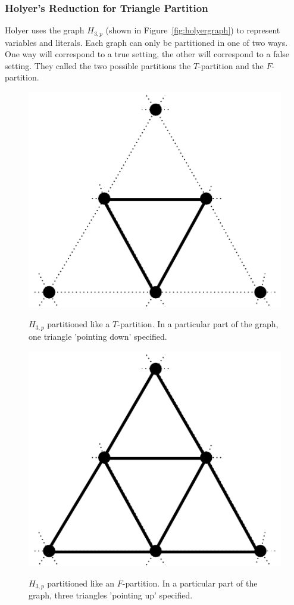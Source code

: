 \documentclass[runningheads,a4paper]{llncs}
\begin{document}
\subsubsection{Holyer's Reduction for Triangle Partition}
%
%
% 
Holyer uses the graph $H_{3,p}$ (shown in Figure~\ref{fig:holyergraph}) to represent variables and literals. Each graph can only be partitioned in one of two ways. One way will correspond to a true setting, the other will correspond to a false setting. They called the two possible partitions the $T$-partition and the $F$-partition. 

\begin{figure}
\begin{minipage}{0.5\linewidth}
\centering
\includegraphics[scale=0.5]{Tpartition.pdf}
\label{fig:tpart}
\caption{$H_{3,p}$ partitioned like a $T$-partition. In a particular part of the graph, one triangle 'pointing down' specified.}
\end{minipage}
\hfill
\begin{minipage}{0.5\linewidth}
\centering
\label{fig:fpart}
\includegraphics[scale=0.5]{Fpartition.pdf}
\caption{$H_{3,p}$ partitioned like an $F$-partition. In a particular part of the graph, three triangles 'pointing up' specified.}
\end{minipage}
\end{figure}
\end{document}

